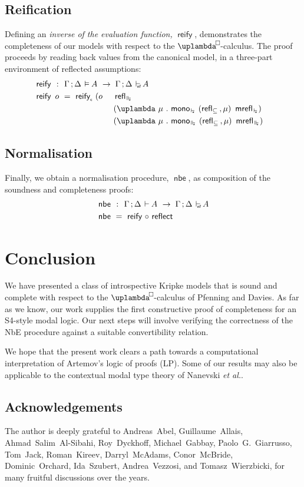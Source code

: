 \documentclass[submission,copyright,creativecommons,sharealike,backref=page]{eptcs}
\newcommand{\uplambdabox}{\uplambda^{\mkern-3mu\Box\mkern-3mu}}
\newcommand{\sA}{\mkern-2muA}
\renewcommand{\leq}{\mathrel{\subseteq}}
\renewcommand{\:}{\mathop{\mkern3mu:\mkern3mu}}
\renewcommand{\.}{\mathop{\mkern3mu.\mkern3mu}}
\renewcommand{\;}{\mathop{;}}
\renewcommand{\,}{\mathop{,}}
\renewcommand{\o}{\mathop{\mkern3mu\circ\mkern3mu}}
\newcommand{\e}{\mathrel{\mkern2mu\vdash\mkern1mu}}
\newcommand{\enf}{\mathrel{\mkern2mu\vdash_{\mkern-9mu\scriptscriptstyle{\textsf{nf}}}}}
\newcommand{\es}{\mathrel{\mkern2mu\vdash_{\mkern-9mu\scriptscriptstyle{\star}}}}
\newcommand{\ees}{\mathrel{\mkern2mu\Vdash_{\mkern-9mu\scriptscriptstyle{\star}}}}
\newcommand{\ef}{\mathrel{\mkern2mu\vDash\mkern1mu}}
\renewcommand{\r}{\mathrel{\rightarrow\mkern-1mu}}
\newcommand{\reflect}{\operatorname{\textsf{reflect}}}
\newcommand{\reify}{\operatorname{\textsf{reify}}}
\newcommand{\reifyc}{\operatorname{\textsf{reify}_{\scriptscriptstyle{\textsf{c}}}}}
\newcommand{\nbe}{\operatorname{\textsf{nbe}}}
\newcommand{\monoes}{\operatorname{\textsf{mono}_{\es}}}
\newcommand{\monoees}{\operatorname{\textsf{mono}_{\ees}}}
\newcommand{\reflleq}{\operatorname{\textsf{refl}_{\leq}}}
\newcommand{\mrefles}{\operatorname{\textsf{mrefl}_{\es}}}
\newcommand{\reflees}{\operatorname{\textsf{refl}_{\ees}}}
\newcommand{\mreflees}{\operatorname{\textsf{mrefl}_{\ees}}}
\theoremstyle{mystyle}
\begin{document}
\subsection{Reification}

Defining an \emph{inverse of the evaluation function,} $\reify$, demonstrates the completeness of our models with respect to the $\uplambdabox$-calculus.  The proof proceeds by reading back values from the canonical model, in a three-part environment of reflected assumptions:
\begin{alignat*}{2}
  & \reify ~\:~ \rlap{$\Gamma \; \Delta \ef \sA ~\r~ \Gamma \; \Delta \enf \sA$}\\
  & \reify~o ~=~ \reifyc~(o~ && \reflees\\
  &                          && (\uplambda~\mu \. \monoes~(\reflleq \, \mu)~\mrefles)\\
  &                          && (\uplambda~\mu \. \monoees~(\reflleq \, \mu)~\mreflees)
\end{alignat*}


\subsection{Normalisation}

Finally, we obtain a normalisation procedure, $\nbe$, as composition of the soundness and completeness proofs:
\begin{align*}
  & \nbe ~\:~ \Gamma \; \Delta \e \sA ~\r~ \Gamma \; \Delta \enf \sA\\
  & \nbe ~=~ \reify \o \reflect
\end{align*}


\section*{Conclusion}

We have presented a class of introspective Kripke models that is sound and complete with respect to the $\uplambdabox$-calculus of Pfenning and Davies\cite{PfenningD01}.  As far as we know, our work supplies the first constructive proof of completeness for an S4-style modal logic.  Our next steps will involve verifying the correctness of the NbE procedure against a suitable convertibility relation.

We hope that the present work clears a path towards a computational interpretation of Artemov's\cite{Artemov01} logic of proofs (LP).  Some of our results may also be applicable to the contextual modal type theory of Nanevski \emph{et al.}\cite{NanevskiPP08}.


\subsection*{Acknowledgements}

The author is deeply grateful to Andreas~Abel, Guillaume~Allais, Ahmad~Salim~Al-Sibahi, Roy~Dyckhoff, Michael~Gabbay, Paolo~G.~Giarrusso, Tom~Jack, Roman~Kireev, Darryl~McAdams, Conor~McBride, Dominic~Orchard, Ida~Szubert, Andrea~Vezzosi, and Tomasz~Wierzbicki, for many fruitful discussions over the years.

\nocite{*}
% 


\end{document}
